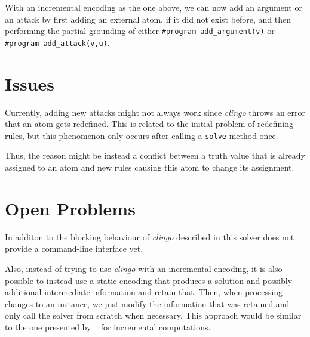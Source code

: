 \documentclass[oneside,12pt]{amsart}
\begin{document}
With an incremental encoding as the one above, we can now add 
an argument or an attack by first adding an external atom,
if it did not exist before, and then performing the partial grounding 
of either \texttt{\#program add\_argument(v)} or \texttt{\#program add\_attack(v,u)}.

\section{Issues}\label{issues}
Currently, adding new attacks might not always work since \emph{clingo} 
throws an error that an atom gets redefined. This is related to the initial 
problem of redefining rules, but this phenomenon only occurs 
after calling a \texttt{solve} method once. 

Thus, the reason might be instead a conflict between a truth value 
that is already assigned to an atom and new rules causing this atom 
to change its assignment.


\section{Open Problems}\label{problems}
In additon to the blocking behaviour of \emph{clingo} described in  
this solver does not provide a command-line interface yet.

Also, instead of trying to use \emph{clingo} with an incremental encoding, 
it is also possible to instead use a static encoding that produces a solution 
and possibly additional intermediate information and retain that. 
Then, when processing changes to an instance, we just modify the information 
that was retained and only call the solver from scratch when necessary.
This approach would be similar to the one presented by \citeauthor{mans_incremental_2017}~\cite{mans_incremental_2017}
for incremental computations.

\printbibliography
\end{document}
